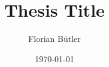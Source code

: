 \documentclass[a4paper, oneside]{thesis}
\title{Thesis Title}
\author{Florian Bütler}
\institute{Chair of Information Technology and Education \\[2pt]
ETH Zürich}
\date{\today}
\begin{document}
\frontmatter %
\maketitle

\cleardoublepage

\begin{acknowledgements}
	
\end{acknowledgements}


\begin{abstract}
	
\end{abstract}

\tableofcontents

\mainmatter %








\appendix

\end{document}

